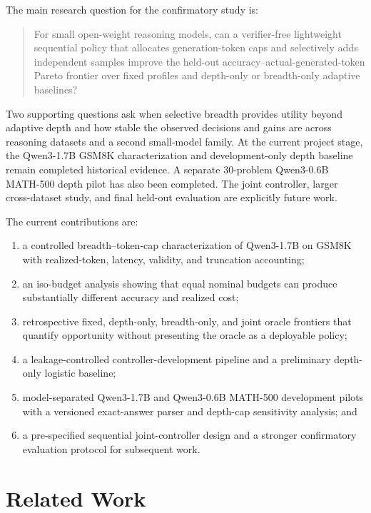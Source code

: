 \documentclass[runningheads]{llncs}
\begin{document}
The main research question for the confirmatory study is:

\begin{quote}
For small open-weight reasoning models, can a verifier-free lightweight
sequential policy that allocates generation-token caps and selectively adds
independent samples improve the held-out accuracy--actual-generated-token
Pareto frontier over fixed profiles and depth-only or breadth-only adaptive
baselines?
\end{quote}

Two supporting questions ask when selective breadth provides utility beyond
adaptive depth and how stable the observed decisions and gains are across
reasoning datasets and a second small-model family. At the current project
stage, the Qwen3-1.7B GSM8K characterization and development-only depth
baseline remain completed historical evidence. A separate 30-problem
Qwen3-0.6B MATH-500 depth pilot has also been completed. The joint controller,
larger cross-dataset study, and final held-out evaluation are explicitly future
work.

The current contributions are:

\begin{enumerate}
  \item a controlled breadth--token-cap characterization of Qwen3-1.7B on
  GSM8K with realized-token, latency, validity, and truncation accounting;
  \item an iso-budget analysis showing that equal nominal budgets can produce
  substantially different accuracy and realized cost;
  \item retrospective fixed, depth-only, breadth-only, and joint oracle
  frontiers that quantify opportunity without presenting the oracle as a
  deployable policy;
  \item a leakage-controlled controller-development pipeline and a preliminary
  depth-only logistic baseline;
  \item model-separated Qwen3-1.7B and Qwen3-0.6B MATH-500 development pilots
  with a versioned exact-answer parser and depth-cap sensitivity analysis; and
  \item a pre-specified sequential joint-controller design and a stronger
  confirmatory evaluation protocol for subsequent work.
\end{enumerate}

\section{Related Work}
\end{document}
